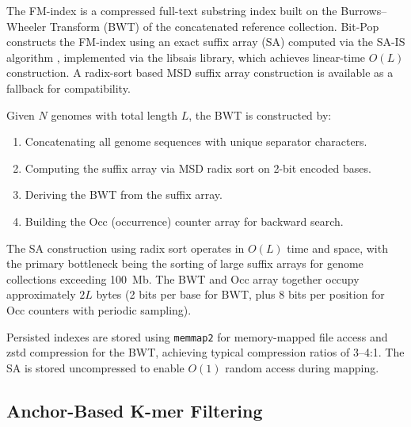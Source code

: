 \documentclass[10pt]{article}
\begin{document}
The FM-index \citep{burrows1994,ferrada2007} is a compressed full-text substring index built on the Burrows--Wheeler Transform (BWT) of the concatenated reference collection. Bit-Pop constructs the FM-index using an exact suffix array (SA) computed via the SA-IS algorithm \citep{karkkainen2003}, implemented via the libsais library, which achieves linear-time $O(L)$ construction. A radix-sort based MSD suffix array construction is available as a fallback for compatibility.

Given $N$ genomes with total length $L$, the BWT is constructed by:
\begin{enumerate}
    \item Concatenating all genome sequences with unique separator characters.
    \item Computing the suffix array via MSD radix sort on 2-bit encoded bases.
    \item Deriving the BWT from the suffix array.
    \item Building the Occ (occurrence) counter array for backward search.
\end{enumerate}

The SA construction using radix sort operates in $O(L)$ time and space, with the primary bottleneck being the sorting of large suffix arrays for genome collections exceeding 100~Mb. The BWT and Occ array together occupy approximately $2L$ bytes (2 bits per base for BWT, plus 8 bits per position for Occ counters with periodic sampling).

Persisted indexes are stored using \texttt{memmap2} for memory-mapped file access and zstd compression for the BWT, achieving typical compression ratios of 3--4:1. The SA is stored uncompressed to enable $O(1)$ random access during mapping.

\subsection{Anchor-Based K-mer Filtering}
\end{document}
